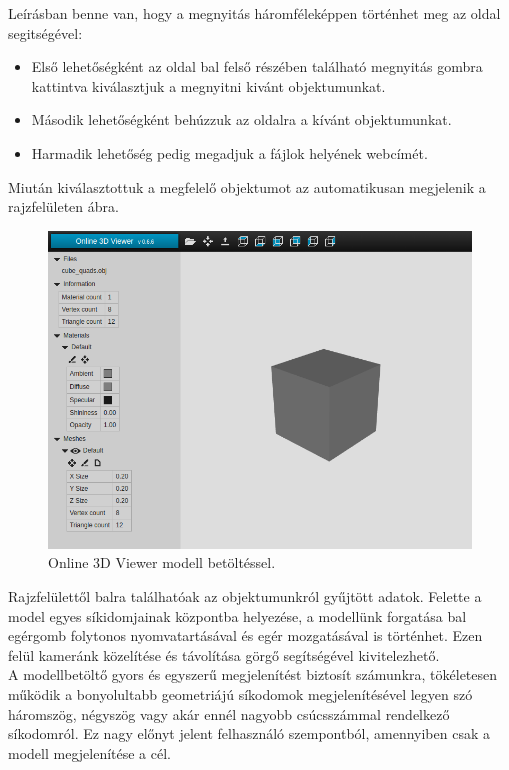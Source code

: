 Leírásban benne van, hogy a megnyitás háromféleképpen történhet meg az oldal segitségével:
\begin{itemize}
\item Első lehetőségként az oldal bal felső részében található megnyitás gombra kattintva kiválasztjuk a megnyitni kivánt objektumunkat.
\item Második lehetőségként behúzzuk az oldalra a kívánt objektumunkat.
\item Harmadik lehetőség pedig megadjuk a fájlok helyének webcímét.
\end{itemize}
\newpage
Miután kiválasztottuk a megfelelő objektumot az automatikusan megjelenik a rajzfelületen  ábra.
\begin{figure}[h]
\centering
\includegraphics[width=\textwidth]{images/Model_Viewer_2.png}
\caption{Online 3D Viewer modell betöltéssel.}
\label{fig:model_viewer2}
\end{figure}

Rajzfelülettől balra találhatóak az objektumunkról gyűjtött adatok. Felette a model egyes síkidomjainak központba helyezése, a modellünk forgatása bal egérgomb folytonos nyomvatartásával és egér mozgatásával is történhet. Ezen felül kameránk közelítése és távolítása görgő segítségével kivitelezhető.\\

A modellbetöltő gyors és egyszerű megjelenítést biztosít számunkra, tökéletesen működik a bonyolultabb geometriájú síkodomok megjelenítésével legyen szó háromszög, négyszög vagy akár ennél nagyobb csúcsszámmal rendelkező síkodomról. Ez nagy előnyt jelent felhasználó szempontból, amennyiben csak a modell megjelenítése a cél.\\

